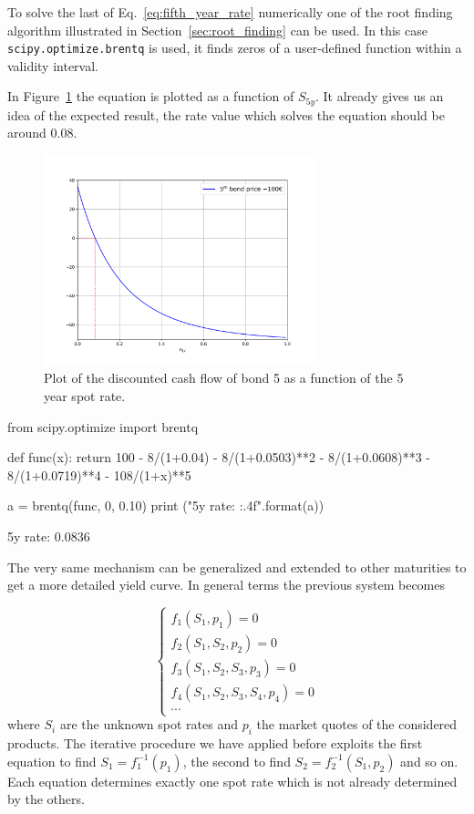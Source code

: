 To solve the last of Eq.~\ref{eq:fifth_year_rate} numerically one of the root finding algorithm illustrated in Section~\ref{sec:root_finding} can be used. 
In this case \texttt{scipy.optimize.brentq} is used, it finds zeros of a user-defined function within a validity interval.

In Figure~\ref{fig:fifth_year_rate} the equation is plotted as a function of $S_{5y}$. It already gives us an idea of the expected result, the rate value which solves the equation should be around 0.08.

\begin{figure}[htb]
  \centering
  \includegraphics[width=0.7\textwidth]{figures/bond_5_plot.png}
  \caption{Plot of the discounted cash flow of bond 5 as a function of the 5 year spot rate.}
  \label{fig:fifth_year_rate}
\end{figure}

\begin{ipython}
from scipy.optimize import brentq

def func(x):
    return 100 - 8/(1+0.04) - 8/(1+0.0503)**2 - 8/(1+0.0608)**3
               - 8/(1+0.0719)**4 - 108/(1+x)**5
               
a = brentq(func, 0, 0.10)
print ("5y rate: {:.4f}".format(a))
\end{ipython}
\begin{ioutput}
5y rate: 0.0836
\end{ioutput}

The very same mechanism can be generalized and extended to other maturities to get a more detailed yield curve. In general terms the previous system becomes

\begin{equation}
\begin{cases}
f_1(S_1, p_1) = 0 \\
f_2(S_1, S_2, p_2) = 0 \\
f_3(S_1, S_2, S_3, p_3) = 0 \\
f_4(S_1, S_2, S_3, S_4, p_4) = 0 \\
\cdots
\end{cases}
\end{equation}
where $S_i$ are the unknown spot rates and $p_i$ the market quotes of the considered products. The iterative procedure we have applied before exploits the first equation to find $S_1 = f_1^{-1}(p_1)$, the second to find $S_2 = f_2^{-1}(S_1, p_2)$ and so on. Each equation determines exactly one spot rate which is not already determined by the others.

